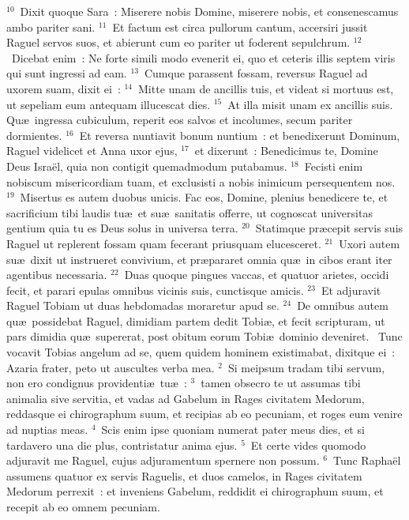 ${}^{10}$~Dixit quoque Sara~: Miserere nobis Domine, miserere nobis, et consenescamus ambo pariter sani.
${}^{11}$~Et factum est circa pullorum cantum, accersiri jussit Raguel servos suos, et abierunt cum eo pariter ut foderent sepulchrum.
${}^{12}$~Dicebat enim~: Ne forte simili modo evenerit ei, quo et ceteris illis septem viris qui sunt ingressi ad eam.
${}^{13}$~Cumque parassent fossam, reversus Raguel ad uxorem suam, dixit ei~:
${}^{14}$~Mitte unam de ancillis tuis, et videat si mortuus est, ut sepeliam eum antequam illucescat dies.
${}^{15}$~At illa misit unam ex ancillis suis. Qu\ae\ ingressa cubiculum, reperit eos salvos et incolumes, secum pariter dormientes.
${}^{16}$~Et reversa nuntiavit bonum nuntium~: et benedixerunt Dominum, Raguel videlicet et Anna uxor ejus,
${}^{17}$~et dixerunt~: Benedicimus te, Domine Deus Isra\"el, quia non contigit quemadmodum putabamus.
${}^{18}$~Fecisti enim nobiscum misericordiam tuam, et exclusisti a nobis inimicum persequentem nos.
${}^{19}$~Misertus es autem duobus unicis. Fac eos, Domine, plenius benedicere te, et sacrificium tibi laudis tu\ae\ et su\ae\ sanitatis offerre, ut cognoscat universitas gentium quia tu es Deus solus in universa terra.
${}^{20}$~Statimque pr\ae cepit servis suis Raguel ut replerent fossam quam fecerant priusquam elucesceret.
${}^{21}$~Uxori autem su\ae\ dixit ut instrueret convivium, et pr\ae pararet omnia qu\ae\ in cibos erant iter agentibus necessaria.
${}^{22}$~Duas quoque pingues vaccas, et quatuor arietes, occidi fecit, et parari epulas omnibus vicinis suis, cunctisque amicis.
${}^{23}$~Et adjuravit Raguel Tobiam ut duas hebdomadas moraretur apud se.
${}^{24}$~De omnibus autem qu\ae\ possidebat Raguel, dimidiam partem dedit Tobi\ae , et fecit scripturam, ut pars dimidia qu\ae\ supererat, post obitum eorum Tobi\ae\ dominio deveniret.
~\lettrine[lines=10,image=true,loversize=0.05,lraise=-0.03]{T}{}unc vocavit Tobias angelum ad se, quem quidem hominem existimabat, dixitque ei~: Azaria frater, peto ut auscultes verba mea.
${}^{2}$~Si meipsum tradam tibi servum, non ero condignus providenti\ae\ tu\ae~:
${}^{3}$~tamen obsecro te ut assumas tibi animalia sive servitia, et vadas ad Gabelum in Rages civitatem Medorum, reddasque ei chirographum suum, et recipias ab eo pecuniam, et roges eum venire ad nuptias meas.
${}^{4}$~Scis enim ipse quoniam numerat pater meus dies, et si tardavero una die plus, contristatur anima ejus.
${}^{5}$~Et certe vides quomodo adjuravit me Raguel, cujus adjuramentum spernere non possum.
${}^{6}$~Tunc Rapha\"el assumens quatuor ex servis Raguelis, et duos camelos, in Rages civitatem Medorum perrexit~: et inveniens Gabelum, reddidit ei chirographum suum, et recepit ab eo omnem pecuniam.
